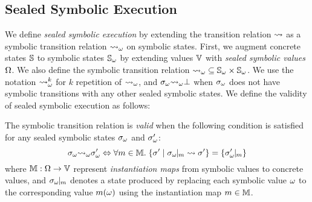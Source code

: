 \subsection{Sealed Symbolic Execution}

We define \textit{sealed symbolic execution} by extending the transition
relation $\leadsto$ as a symbolic transition relation ${\leadsto}_\omega$ on symbolic
states.  First, we augment concrete states $\mathbb{S}$ to symbolic states
${\mathbb{S}}_\omega$ by extending values $\mathbb{V}$ with \textit{sealed symbolic values}
$\Omega$.  We also define the symbolic transition relation ${\leadsto}_\omega
\subseteq {\mathbb{S}}_\omega \times {\mathbb{S}}_\omega$. We use the notation ${\leadsto}_\omega^k$
for $k$ repetition of ${\leadsto}_\omega$, and  ${\sigma}_\omega {\leadsto}_\omega \bot$ when
${\sigma}_\omega$ does not have symbolic transitions with any other sealed symbolic
states.  We define the validity of sealed symbolic execution as follows:
\begin{definition}[Validity]\label{def:valid-symbtrans}
  The symbolic transition relation is \textit{valid} when the following
  condition is satisfied for any sealed symbolic states ${\sigma}_\omega$ and
  ${\sigma}_\omega'$:
  \[
    \symbst \symbtrans \symbst' \Leftrightarrow
    \forall \imap \in \imapset. \;
    \{ \st' \mid \instant{\symbst}{\imap} \trans \st' \}
    = \{ \instant{\symbst'}{\imap} \}
  \]
  where $\mathbb{M}: \Omega \rightarrow \mathbb{V}$ represent \textit{instantiation
  maps} from symbolic values to concrete values, and ${\sigma}_\omega\!\!\mid\!\!_{m}$
  denotes a state produced by replacing each symbolic value $\omega$ to the
  corresponding value $m(\omega)$ using the instantiation map $m \in
  \mathbb{M}$.
\end{definition}

